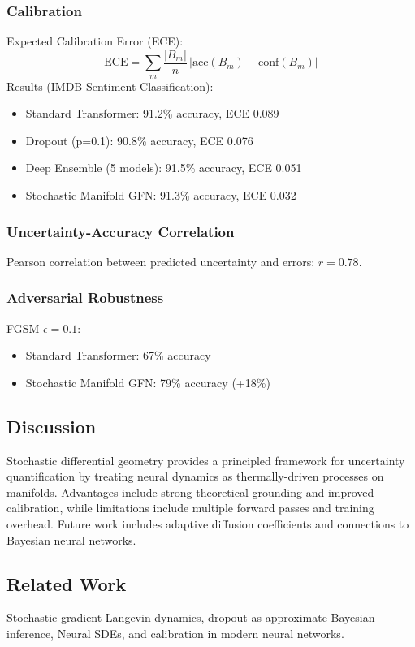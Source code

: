 \documentclass{article}
\numberwithin{equation}{section}
\begin{document}
\subsubsection{Calibration}
Expected Calibration Error (ECE):
\[
\mathrm{ECE} = \sum_m \frac{|B_m|}{n}\,|\mathrm{acc}(B_m) - \mathrm{conf}(B_m)|
\]
Results (IMDB Sentiment Classification):
\begin{itemize}
\item Standard Transformer: 91.2\% accuracy, ECE 0.089
\item Dropout (p=0.1): 90.8\% accuracy, ECE 0.076
\item Deep Ensemble (5 models): 91.5\% accuracy, ECE 0.051
\item Stochastic Manifold GFN: 91.3\% accuracy, ECE 0.032
\end{itemize}

\subsubsection{Uncertainty-Accuracy Correlation}
Pearson correlation between predicted uncertainty and errors: $r = 0.78$.

\subsubsection{Adversarial Robustness}
FGSM $\epsilon=0.1$:
\begin{itemize}
\item Standard Transformer: 67\% accuracy
\item Stochastic Manifold GFN: 79\% accuracy (+18\%)
\end{itemize}

\subsection{Discussion}
Stochastic differential geometry provides a principled framework for uncertainty quantification by treating neural dynamics as thermally-driven processes on manifolds. Advantages include strong theoretical grounding and improved calibration, while limitations include multiple forward passes and training overhead. Future work includes adaptive diffusion coefficients and connections to Bayesian neural networks.

\subsection{Related Work}
Stochastic gradient Langevin dynamics, dropout as approximate Bayesian inference, Neural SDEs, and calibration in modern neural networks.
\end{document}
